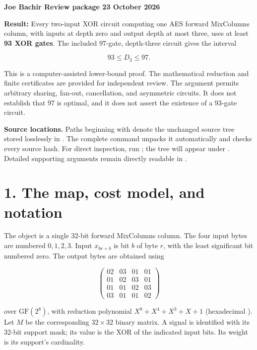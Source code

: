 \textbf{Joe Bachir \textbar{} Review package \textbar{} 23 October 2026}

\textbf{Result:} Every two-input XOR circuit computing one AES forward MixColumns column, with inputs at depth zero and output depth at most three, uses at least \textbf{93 XOR gates}. The included 97-gate, depth-three circuit gives the interval

\[93\leq D_3\leq97.\]

This is a computer-assisted lower-bound proof. The mathematical reduction and finite certificates are provided for independent review. The argument permits arbitrary sharing, fan-out, cancellation, and asymmetric circuits. It does not establish that 97 is optimal, and it does not assert the existence of a 93-gate circuit.

\textbf{Source locations.} Paths beginning with \texttt{} denote the unchanged source tree stored losslessly in \texttt{}. The complete command \texttt{} unpacks it automatically and checks every source hash. For direct inspection, run \texttt{}; the tree will appear under \texttt{}. Detailed supporting arguments remain directly readable in \texttt{}.

\hypertarget{the-map-cost-model-and-notation}{%
\section{1. The map, cost model, and notation}\label{the-map-cost-model-and-notation}}

The object is a single 32-bit forward MixColumns column. The four input bytes are numbered \(0,1,2,3\). Input \(x_{8r+b}\) is bit \(b\) of byte \(r\), with the least significant bit numbered zero. The output bytes are obtained using

\[
\begin{pmatrix}
02&03&01&01\\
01&02&03&01\\
01&01&02&03\\
03&01&01&02
\end{pmatrix}
\]

over \(\mathrm{GF}(2^8)\), with reduction polynomial \(X^8+X^4+X^3+X+1\) (hexadecimal \texttt{}). Let \(M\) be the corresponding \(32\times32\) binary matrix. A signal is identified with its 32-bit support mask; its value is the XOR of the indicated input bits. Its weight is its support's cardinality.

